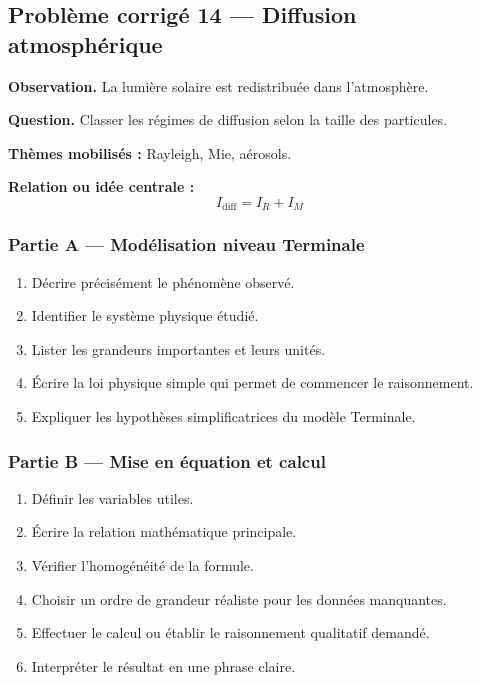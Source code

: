 \documentclass[11pt,a4paper]{article}
\begin{document}
\subsection{Problème corrigé 14 — Diffusion atmosphérique}

\begin{exercicebox}
\textbf{Observation.} La lumière solaire est redistribuée dans l'atmosphère.

\medskip
\textbf{Question.} Classer les régimes de diffusion selon la taille des particules.

\medskip
\textbf{Thèmes mobilisés :} Rayleigh, Mie, aérosols.

\medskip
\textbf{Relation ou idée centrale :}
\[
I_{\mathrm{diff}}=I_R+I_M
\]
\end{exercicebox}

\subsubsection*{Partie A — Modélisation niveau Terminale}

\begin{enumerate}
  \item Décrire précisément le phénomène observé.
  \item Identifier le système physique étudié.
  \item Lister les grandeurs importantes et leurs unités.
  \item Écrire la loi physique simple qui permet de commencer le raisonnement.
  \item Expliquer les hypothèses simplificatrices du modèle Terminale.
\end{enumerate}

\subsubsection*{Partie B — Mise en équation et calcul}

\begin{enumerate}
  \item Définir les variables utiles.
  \item Écrire la relation mathématique principale.
  \item Vérifier l'homogénéité de la formule.
  \item Choisir un ordre de grandeur réaliste pour les données manquantes.
  \item Effectuer le calcul ou établir le raisonnement qualitatif demandé.
  \item Interpréter le résultat en une phrase claire.
\end{enumerate}
\end{document}
